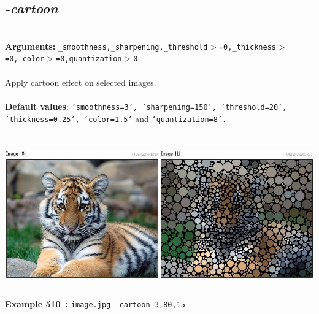 \documentclass[a4paper,11pt,twoside]{book}
\begin{document}
\subsection{\emph{-cartoon} }\vspace*{-0.5em}
~\\\textbf{Arguments: } 
{\small \texttt{\_smoothness,\_sharpening,\_threshold$>$=0,\_thickness$>$=0,\_color$>$=0,quantization$>$0}}\\~\\
Apply cartoon effect on selected images.
~\\~\\\textbf{Default values}: {\small \texttt{'smoothness=3', 'sharpening=150', 'threshold=20', 'thickness=0.25', 'color=1.5'} and \texttt{'quantization=8'.}}
\begin{center}\includegraphics[keepaspectratio=true,height=7cm,width=\textwidth]{img/gmic_def510.jpg}\\
{\footnotesize \textbf{Example 510~:} \texttt{image.jpg --cartoon 3,80,15}}
\end{center}
\end{document}
